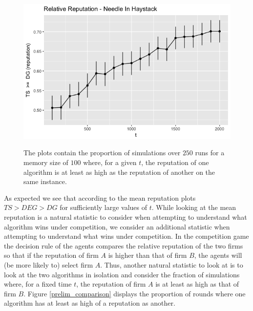 \documentclass{article}
\theoremstyle{definition}
\begin{document}
\begin{figure}
\includegraphics[scale=0.2]{"figures/ts_dg_nih_10_prelim"} \\
\caption*{\tiny{The plots contain the proportion of simulations over $250$ runs for a memory size of $100$ where, for a given $t$, the reputation of one algorithm is at least as high as the reputation of another on the same instance.}}
\label{relative_rep}
\end{figure}

As expected we see that according to the mean reputation plots $TS > DEG > DG$ for sufficiently large values of $t$. While looking at the mean reputation is a natural statistic to consider when attempting to understand what algorithm wins under competition, we consider an additional statistic when attempting to understand what wins under competition. In the competition game the decision rule of the agents compares the relative reputation of the two firms so that if the reputation of firm $A$ is higher than that of firm $B$, the agents will (be more likely to) select firm $A$. Thus, another natural statistic to look at is to look at the two algorithms in isolation and consider the fraction of simulations where, for a fixed time $t$, the reputation of firm $A$ is at least as high as that of firm $B$. Figure \ref{prelim_comparison} displays the proportion of rounds where one algorithm has at least as high of a reputation as another.
\end{document}
